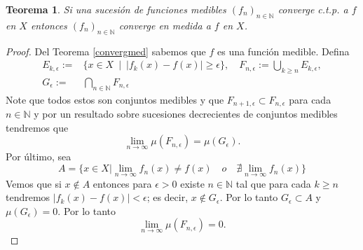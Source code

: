 \documentclass[twoside,12pt,a4 paper,openright]{book}
\newtheorem{teo}[claim]{Teorema}
\begin{document}
\begin{teo}
 Si una sucesi\'on de funciones medibles $(f_n)_{n\in \mathbb N}$  converge c.t.p.  a $f$ en $X$ entonces  $(f_n)_{n\in \mathbb N}$  converge en medida  a $f$ en $X$.
 \end{teo}
\begin{proof}
Del Teorema \ref{convergmed} sabemos que $f $ es una funci\'on medible. Defina  
\begin{align*}
E_{k,\epsilon} := &  \{ x\in X \ \mid \  |f_k(x) - f(x) | \geq \epsilon \} , \quad  
F_{n, \epsilon} :=   \bigcup_{k\geq n} E_{k,\epsilon} ,\\
G_\epsilon :=  & \bigcap_{n\in\mathbb N} F_{n,\epsilon}  
\end{align*}
Note que todos estos son conjuntos medibles y que  $F_{n+1, \epsilon} \subset F_{n, \epsilon} $    para cada $n\in \mathbb N$ y por un resultado sobre sucesiones decrecientes de conjuntos medibles tendremos que 
$$\lim_{n\to \infty }\mu( F_{n, \epsilon} ) = \mu (G_{ \epsilon}) . $$
Por \'ultimo, sea 
$$A = \{x\in X | \lim_{n\to \infty}f_n(x)\neq f(x) \quad o\quad \nexists\lim_{n\to \infty}f_n(x)\}  $$
Vemos que si $x\notin A  $ entonces para $\epsilon >0$ existe    $n\in \mathbb N$ tal que para cada  $k\geq n$   tendremos 
$ |  f_k(x) - f(x)| < \epsilon $; es decir, $x\notin G_{\epsilon} $. Por lo tanto $ G_{\epsilon}\subset A$ y $\mu(  G_{\epsilon}) =0$. Por lo tanto  
$$\lim_{n\to \infty }\mu( F_{n, \epsilon} ) =0. $$
 \end{proof}
\end{document}
